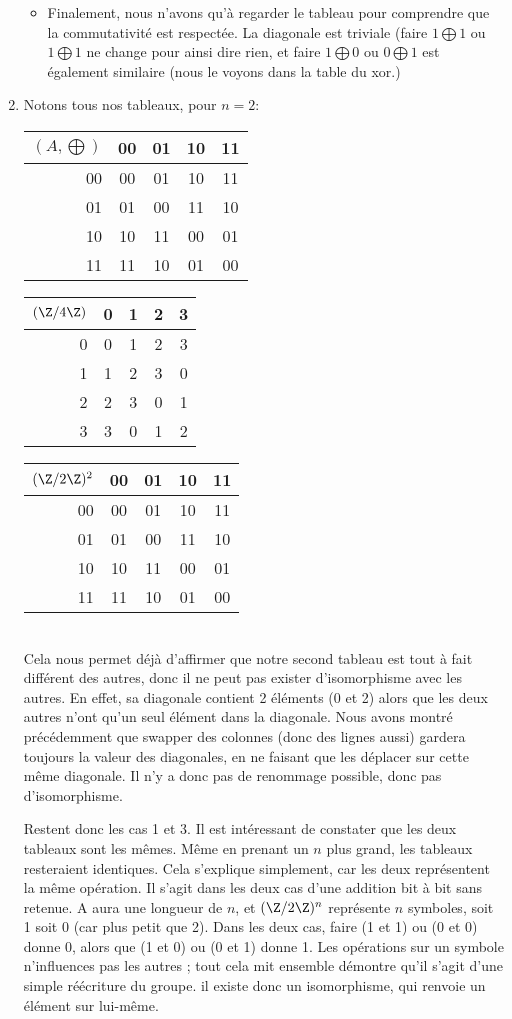 \documentclass[10p,a4paper]{scrartcl}
\begin{document}
\begin{enumerate}
\begin{itemize}
				\item Finalement, nous n'avons qu'à regarder le tableau pour comprendre que la commutativité est respectée. La diagonale est triviale (faire $1\bigoplus 1$ ou $1 \bigoplus 1$ ne change pour ainsi dire rien, et faire $1 \bigoplus 0$ ou $0 \bigoplus 1$ est également similaire (nous le voyons dans la table du xor.)
			\end{itemize}
	\item 	Notons tous nos tableaux, pour $n = 2$:\\
			\begin{tabular}{r|cccc}
				$(A,\bigoplus)$ & 00 & 01 & 10 & 11\\
				\hline
				00 & 00 & 01 & 10 & 11\\
				01 & 01 & 00 & 11 & 10\\
				10 & 10 & 11 & 00 & 01\\
				11 & 11 & 10 & 01 & 00
			\end{tabular}
			\begin{tabular}{r|cccc}
				$(\Z/4\Z)$ & 0 & 1 & 2 & 3\\
				\hline
				0 & 0 & 1 & 2 & 3\\
				1 & 1 & 2 & 3 & 0\\
				2 & 2 & 3 & 0 & 1\\
				3 & 3 & 0 & 1 & 2
			\end{tabular}
			\begin{tabular}{r|cccc}
				$(\Z/2\Z)^2$ & 00 & 01 & 10 & 11\\
				\hline
				00 & 00 & 01 & 10 & 11\\
				01 & 01 & 00 & 11 & 10\\
				10 & 10 & 11 & 00 & 01\\
				11 & 11 & 10 & 01 & 00
			\end{tabular}\\
			Cela nous permet déjà d'affirmer que notre second tableau est tout à fait différent des autres, donc il ne peut pas exister d'isomorphisme avec les autres. En effet, sa diagonale contient 2 éléments (0 et 2) alors que les deux autres n'ont qu'un seul élément dans la diagonale. Nous avons montré précédemment que swapper des colonnes (donc des lignes aussi) gardera toujours la valeur des diagonales, en ne faisant que les déplacer sur cette même diagonale. Il n'y a donc pas de renommage possible, donc pas d'isomorphisme.
			
			Restent donc les cas 1 et 3. Il est intéressant de constater que les deux tableaux sont les mêmes. Même en prenant un $n$ plus grand, les tableaux resteraient identiques. Cela s'explique simplement, car les deux représentent la même opération. Il s'agit dans les deux cas d'une addition bit à bit sans retenue. A aura une longueur de $n$, et $(\Z/2\Z)^n$ représente $n$ symboles, soit 1 soit 0 (car plus petit que 2). Dans les deux cas, faire (1 et 1) ou (0 et 0) donne 0, alors que (1 et 0) ou (0 et 1) donne 1. Les opérations sur un symbole n'influences pas les autres ; tout cela mit ensemble démontre qu'il s'agit d'une simple réécriture du groupe. il existe donc un isomorphisme, qui renvoie un élément sur lui-même.
\end{enumerate}
\end{document}
